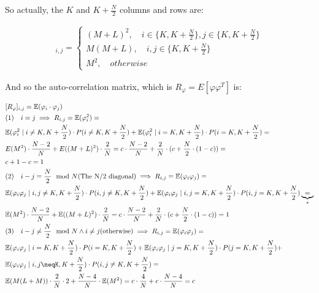 \documentclass[a4paper]{article}
\begin{document}
So actually, the $K$ and $K+\frac{N}{2}$ columns and rows are:

\begin{align*}
    [\varphi \varphi^T]_{i,j}=
    \begin{cases}
        (M+L)^2 ,\quad i\in \{K, K+\frac{N}{2}\}, j\in \{K, K+\frac{N}{2}\} \\
        M(M+L) , \quad i,j\in \{K, K+\frac{N}{2}\} \\
        M^2 , \quad otherwise
    \end{cases}
\end{align*}

And so the auto-correlation matrix, which is $R_\varphi = E[\varphi \varphi^T]$ is:

\begin{align*}
    & [R_\varphi]_{i,j}= \mathbb{E}(\varphi_i \cdot \varphi_j) \\
    & (1)\quad i=j \implies R_{i,j} = \mathbb{E}(\varphi_i^2) = \\
    & \mathbb{E}(\varphi_i^2 \mid i\neq {K,K+\frac{N}{2}}) \cdot P(i\neq {K,K+\frac{N}{2}}) + \mathbb{E}(\varphi_i^2 \mid i= {K,K+\frac{N}{2}}) \cdot P(i= {K,K+\frac{N}{2}}) = \\
    & E(M^2) \cdot \frac{N-2}{N} + E((M+L)^2) \cdot \frac{2}{N} = 
    c \cdot \frac{N-2}{N} + \frac{2}{N} \cdot (c+\frac{N}{2}\cdot(1-c)) = \\
    & c+1-c = 1 \\
    & (2)\quad i-j=\frac{N}{2}\mod N (\text{The N/2 diagonal}) \implies R_{i,j}=\mathbb{E}(\varphi_i \varphi_j) = \\ 
    & \mathbb{E}(\varphi_i \varphi_j \mid i,j\neq {K,K+\frac{N}{2}}) \cdot P(i,j\neq {K,K+\frac{N}{2}}) + \mathbb{E}(\varphi_i \varphi_j \mid i,j = {K,K+\frac{N}{2}}) \cdot P(i,j = {K,K+\frac{N}{2}}) \underbrace{=}_{*} \\
    & \mathbb{E}(M^2) \cdot \frac{N-2}{N} + \mathbb{E}((M+L)^2)\cdot \frac{2}{N} =
    c \cdot \frac{N-2}{N} + \frac{2}{N} \cdot (c+\frac{N}{2}\cdot (1-c)) = 1 \\
    & (3) \quad i-j\neq\frac{N}{2}\mod N \land i\neq j (\text{otherwise}) \implies R_{i,j} = \mathbb{E}(\varphi_i \varphi_j) = \\
    & \mathbb{E}(\varphi_i \varphi_j \mid i=K,K+\frac{N}{2})\cdot P(i=K,K+\frac{N}{2}) + \mathbb{E}(\varphi_i \varphi_j \mid j=K,K+\frac{N}{2})\cdot P(j=K,K+\frac{N}{2}) + \\ & \mathbb{E}(\varphi_i \varphi_j \mid i,j\neqK,K+\frac{N}{2})\cdot P(i,j\neq K,K+\frac{N}{2}) = \\
    & \mathbb{E}(M(L+M))\cdot \frac{2}{N} \cdot 2 + \frac{N-4}{N} \cdot \mathbb{E}(M^2) = c \cdot \frac{4}{N} + c\cdot \frac{N-4}{N} = c
\end{align*}
\end{document}
